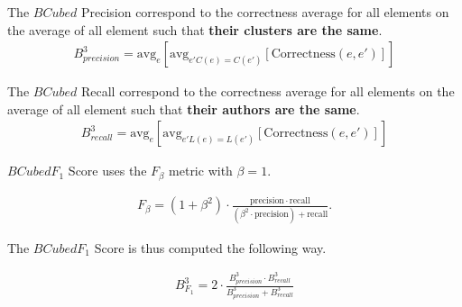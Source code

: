 \begin{definition}
  The $BCubed$ Precision correspond to the correctness average for all elements on the average of all element such that \textbf{their clusters are the same}.
  \begin{gather*}
    B^3_{precision} = \mathrm{avg}_{e}[\mathrm{avg}_{e' C(e)=C(e')}[\mathrm{Correctness}(e, e')]]
  \end{gather*}
\end{definition}

\begin{definition}
  The $BCubed$ Recall correspond to the correctness average for all elements on the average of all element such that \textbf{their authors are the same}.
  \begin{gather*}
    B^3_{recall} = \mathrm{avg}_{e}[\mathrm{avg}_{e' L(e)=L(e')}[\mathrm{Correctness}(e, e')]]
  \end{gather*}
\end{definition}

\begin{definition}
  $BCubed F_1$ Score uses the $F_{\beta}$ metric with $\beta = 1$.

  \begin{gather*}
    F_\beta = (1 + \beta^2) \cdot \frac{\mathrm{precision} \cdot \mathrm{recall}}{(\beta^2 \cdot \mathrm{precision}) + \mathrm{recall}}.
  \end{gather*}

  The $BCubed F_1$ Score is thus computed the following way.

  \begin{gather*}
    B^3_{F_1} =
    2 \cdot \frac{B^3_{precision} \cdot B^3_{recall}} {B^3_{precision} + B^3_{recall}}
  \end{gather*}
\end{definition}

